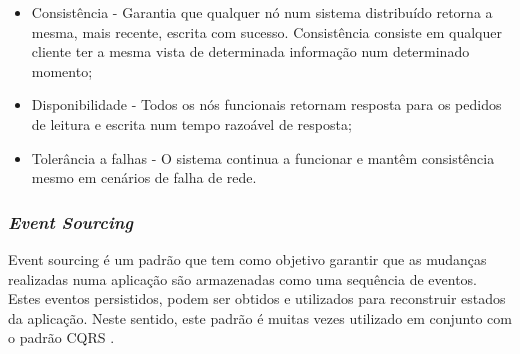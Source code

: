 \begin{itemize}
    \item Consistência - Garantia que qualquer nó num sistema distribuído retorna a mesma, mais recente, escrita com sucesso. Consistência consiste em qualquer cliente ter a mesma vista de determinada informação num determinado momento;
    \item Disponibilidade - Todos os nós funcionais retornam resposta para os pedidos de leitura e escrita num tempo razoável de resposta;
    \item Tolerância a falhas - O sistema continua a funcionar e mantêm consistência mesmo em cenários de falha de rede.
\end{itemize}

\subsubsection{\emph{Event Sourcing} \label{event_sourcing}}
Event sourcing é um padrão que tem como objetivo garantir que as mudanças realizadas numa aplicação são armazenadas como uma sequência de eventos. Estes eventos persistidos, podem ser obtidos e utilizados para reconstruir estados da aplicação.
Neste sentido, este padrão é muitas vezes utilizado em conjunto com o padrão CQRS \cite{event_sourcing}.










